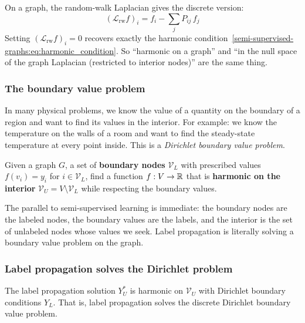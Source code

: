 \begin{notechapter}
On a graph, the random-walk Laplacian gives the discrete version:
\begin{equation}
(\mathcal{L}_{\mathrm{rw}} f)_i = f_i - \sum_j P_{ij}\,f_j
\end{equation}
Setting $(\mathcal{L}_{\mathrm{rw}} f)_i = 0$ recovers exactly the harmonic
condition~\eqref{semi-supervised-graphs:eq:harmonic_condition}. So ``harmonic on a graph'' and
``in the null space of the graph Laplacian (restricted to interior nodes)''
are the same thing.

\subsubsection*{The boundary value problem}

In many physical problems, we know the value of a quantity on the boundary of
a region and want to find its values in the interior. For example: we know
the temperature on the walls of a room and want to find the steady-state
temperature at every point inside. This is a \emph{Dirichlet boundary value
problem}.

\begin{definition}
\label{semi-supervised-graphs:def:dirichlet}
Given a graph $G$, a set of \textbf{boundary nodes} $\mathcal{V}_L$ with
prescribed values $f(v_i) = y_i$ for $i \in \mathcal{V}_L$, find a function
$f : V \to \mathbb{R}$ that is \textbf{harmonic on the interior}
$\mathcal{V}_U = V \setminus \mathcal{V}_L$ while respecting the boundary
values.
\end{definition}

The parallel to semi-supervised learning is immediate: the boundary
nodes are the labeled nodes, the boundary values are the labels, and the
interior is the set of unlabeled nodes whose values we seek. Label
propagation is literally solving a boundary value problem on the graph.

\subsubsection*{Label propagation solves the Dirichlet problem}

\begin{proposition}
\label{semi-supervised-graphs:prop:harmonic}
The label propagation solution $Y_U^*$ is harmonic on $\mathcal{V}_U$ with
Dirichlet boundary conditions $Y_L$. That is, label propagation solves the
discrete Dirichlet boundary value problem.
\end{proposition}


\end{notechapter}
